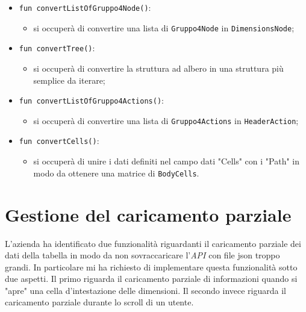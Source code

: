 \begin{itemize}
	\item \verb|fun convertListOfGruppo4Node()|:
	\begin{itemize}
		\item si occuperà di convertire una lista di \verb|Gruppo4Node| in \verb|DimensionsNode|;
	\end{itemize}

	\item \verb|fun convertTree()|:
	\begin{itemize}
		\item si occuperà di convertire la struttura ad albero in una struttura più semplice da iterare;
	\end{itemize}
	
	\item \verb|fun convertListOfGruppo4Actions()|:
	\begin{itemize}
		\item si occuperà di convertire una lista di \verb|Gruppo4Actions| in \verb|HeaderAction|;
	\end{itemize}

	\item \verb|fun convertCells()|:
	\begin{itemize}
		\item si occuperà di unire i dati definiti nel campo dati "Cells" con i "Path" in modo da ottenere una matrice di \verb|BodyCells|.
	\end{itemize}
\end{itemize}

\section{Gestione del caricamento parziale}
L'azienda ha identificato due funzionalità riguardanti il caricamento parziale dei dati della tabella in modo da non sovraccaricare l'\emph{API} con file json troppo grandi. In particolare mi ha richiesto di implementare questa funzionalità sotto due aspetti. Il primo riguarda il caricamento parziale di informazioni quando si "apre" una cella d'intestazione delle dimensioni. Il secondo invece riguarda il caricamento parziale durante lo scroll di un utente.

